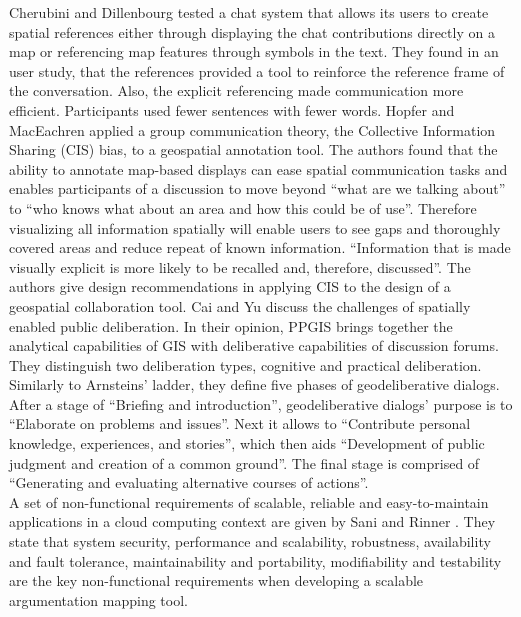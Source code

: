Cherubini and Dillenbourg \cite{Cherubini2007_shared_maps} tested a chat system that allows its users to create spatial references either through displaying the chat contributions directly on a map or referencing map features through symbols in the text. They found in an user study, that the references provided a tool to reinforce the reference frame of the conversation. Also, the explicit referencing made communication more efficient. Participants used fewer sentences with fewer words. Hopfer and MacEachren \cite{Hopfer2007_Communication} applied a group communication theory, the Collective Information Sharing (CIS) bias, to a geospatial annotation tool. The authors found that the ability to annotate map-based displays can ease spatial communication tasks and enables participants of a discussion to move beyond ``what are we talking about'' to ``who knows what about an area and how this could be of use''. Therefore visualizing all information spatially will enable users to see gaps and thoroughly covered areas and reduce repeat of known information. ``Information that is made visually explicit is more likely to be recalled and, therefore, discussed''. The authors give design recommendations in applying CIS to the design of a geospatial collaboration tool. Cai and Yu \cite{Cai2009_spatial_annotation_deliberation} discuss the challenges of spatially enabled public deliberation. In their opinion, PPGIS brings together the analytical capabilities of GIS with deliberative capabilities of discussion forums. They distinguish two deliberation types, cognitive and practical deliberation. Similarly to Arnsteins' ladder, they define five phases of geodeliberative dialogs. After a stage of ``Briefing and introduction'', geodeliberative dialogs' purpose is to ``Elaborate on problems and issues''. Next it allows to ``Contribute personal knowledge, experiences, and stories'', which then aids ``Development of public judgment and creation of a common ground''. The final stage is comprised of ``Generating and evaluating alternative courses of actions''.\\
A set of non-functional requirements of scalable, reliable and easy-to-maintain applications in a cloud computing context are given by Sani and Rinner \cite{Sani2011_Scalable_Argumap}. They state that system security, performance and scalability, robustness, availability and fault tolerance, maintainability and portability, modifiability and testability are the key non-functional requirements when developing a scalable argumentation mapping tool.\\
